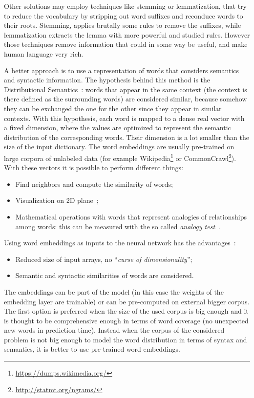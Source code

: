 Other solutions may employ techniques like stemming or lemmatization, that try to reduce the vocabulary by stripping out word suffixes and reconduce words to their roots. Stemming, applies brutally some rules to remove the suffixes, while lemmatization extracts the lemma with more powerful and studied rules. However those techniques remove information that could in some way be useful, and make human language very rich.

A better approach is to use a representation of words that considers semantics and syntactic information. The hypothesis behind this method is the Distributional Semantics~\cite{sahlgren2008distributional}: words that appear in the same context (the context is there defined as the surrounding words) are considered similar, because somehow they can be exchanged the one for the other since they appear in similar contexts. With this hypothesis, each word is mapped to a dense real vector with a fixed dimension,  where the values are optimized to represent the semantic distribution of the corresponding words. Their dimension is a lot smaller than the size of the input dictionary. The word embeddings are usually pre-trained on large corpora of unlabeled data (for example Wikipedia\footnote{\url{https://dumps.wikimedia.org/}} or CommonCrawl\footnote{\url{http://statmt.org/ngrams/}}).
\\
With these vectors it is possible to perform different things:

\begin{itemize}
	\item Find neighbors and compute the similarity of words;
	\item Visualization on 2D plane~\cite{maaten2008visualizing};
	\item Mathematical operations with words that represent analogies of relationships among words: this can be measured with the so called \textit{analogy test}~\cite{mikolov2013linguistic}.
\end{itemize}
Using word embeddings as inputs to the neural network has the advantages~\cite{bengio2003neural}:

\begin{itemize}
	\item Reduced size of input arrays, no ``\textit{curse of dimensionality}'';
	\item Semantic and syntactic similarities of words are considered.
\end{itemize}
The embeddings can be part of the model (in this case the weights of the embedding layer are trainable) or can be pre-computed on external bigger corpus. The first option is preferred when the size of the used corpus is big enough and it is thought to be comprehensive enough in terms of word coverage (no unexpected new words in prediction time). Instead when the corpus of the considered problem is not big enough to model the word distribution in terms of syntax and semantics, it is better to use pre-trained word embeddings.

